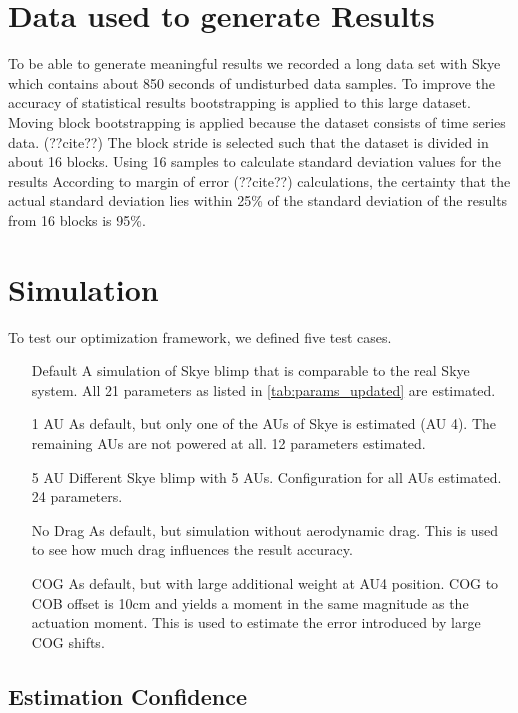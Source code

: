 \section{Data used to generate Results}
To be able to generate meaningful results we recorded a long data set with Skye which contains about 850 seconds of undisturbed data samples.
To improve the accuracy of statistical results bootstrapping is applied to this large dataset.
Moving block bootstrapping is applied because the dataset consists of time series data. (??cite??)
The block stride is selected such that the dataset is divided in about 16 blocks.
Using 16 samples to calculate standard deviation values for the results 
According to margin of error (??cite??) calculations, the certainty that the actual standard deviation lies within 25\% of the standard deviation of the results from 16 blocks is 95\%.

\section{Simulation}
To test our optimization framework, we defined five test cases.
\begin{itemize}
\item[Default] A simulation of Skye blimp that is comparable to the real Skye system. All 21 parameters as listed in \cref{tab:params_updated} are estimated.
\item[1 AU] As default, but only one of the AUs of Skye is estimated (AU 4). The remaining AUs are not powered at all. 12 parameters estimated.
\item[5 AU] Different Skye blimp with 5 AUs. Configuration for all AUs estimated. 24 parameters.
\item[No Drag] As default, but simulation without aerodynamic drag. This is used to see how much drag influences the result accuracy.
\item[COG] As default, but with large additional weight at AU4 position. COG to COB offset is 10cm and yields a moment in the same magnitude as the actuation moment. This is used to estimate the error introduced by large COG shifts.
\end{itemize}
\subsection{Estimation Confidence}


